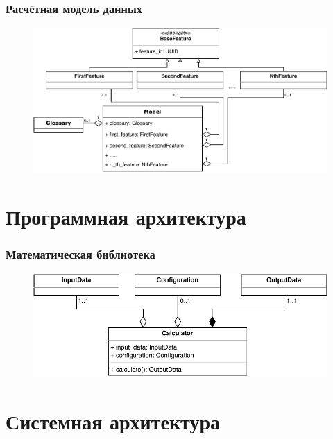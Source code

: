 \begin{frame}
\frametitle{Расчётная модель данных}
\begin{figure}
    \includegraphics[scale=.7]{pictures/architecture/model_classes}
\end{figure}
\end{frame}

\section{Программная архитектура}

\begin{frame}
\frametitle{Математическая библиотека}
\begin{figure}
    \includegraphics[scale=.9]{pictures/architecture/math_classes}
\end{figure}
\end{frame}

\section{Системная архитектура}

